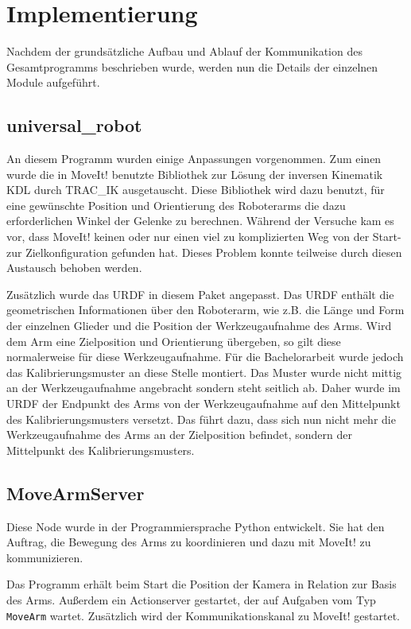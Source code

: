 \chapter{Implementierung}
\label{chap:implementierung}
Nachdem der grundsätzliche Aufbau und Ablauf der Kommunikation des Gesamtprogramms beschrieben wurde, werden nun die Details der einzelnen Module aufgeführt.

\section{universal\_robot} %
\label{sec:universal_robot_impl}
An diesem Programm wurden einige Anpassungen vorgenommen. Zum einen wurde die in MoveIt! benutzte Bibliothek zur Lösung der inversen Kinematik KDL durch TRAC\_IK ausgetauscht. Diese Bibliothek wird dazu benutzt, für eine gewünschte Position und Orientierung des Roboterarms die dazu erforderlichen Winkel der Gelenke zu berechnen. Während der Versuche kam es vor, dass MoveIt! keinen oder nur einen viel zu komplizierten Weg von der Start- zur Zielkonfiguration gefunden hat. Dieses Problem konnte teilweise durch diesen Austausch behoben werden.

Zusätzlich wurde das URDF in diesem Paket angepasst. Das URDF enthält die geometrischen Informationen über den Roboterarm, wie z.B. die Länge und Form der einzelnen Glieder und die Position der Werkzeugaufnahme des Arms. Wird dem Arm eine Zielposition und Orientierung übergeben, so gilt diese normalerweise für diese Werkzeugaufnahme. Für die Bachelorarbeit wurde jedoch das Kalibrierungsmuster an diese Stelle montiert. Das Muster wurde nicht mittig an der Werkzeugaufnahme angebracht sondern steht seitlich ab. Daher wurde im URDF der Endpunkt des Arms von der Werkzeugaufnahme auf den Mittelpunkt des Kalibrierungsmusters versetzt. Das führt dazu, dass sich nun nicht mehr die Werkzeugaufnahme des Arms an der Zielposition befindet, sondern der Mittelpunkt des Kalibrierungsmusters.

\section{MoveArmServer} %
\label{sec:movearmserver_impl}
Diese Node wurde in der Programmiersprache Python entwickelt. Sie hat den Auftrag, die Bewegung des Arms zu koordinieren und dazu mit MoveIt! zu kommunizieren.

Das Programm erhält beim Start die Position der Kamera in Relation zur Basis des Arms. Außerdem ein Actionserver gestartet, der auf Aufgaben vom Typ \texttt{MoveArm} wartet. Zusätzlich wird der Kommunikationskanal zu MoveIt! gestartet.

